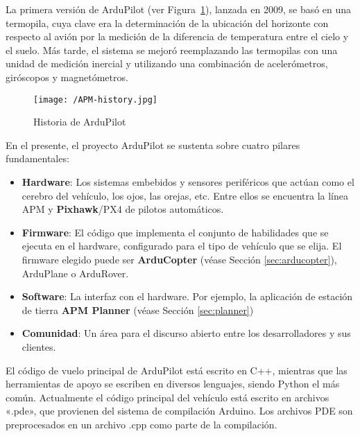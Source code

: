 La primera versión de ArduPilot (ver Figura~\ref{fig:APMHistory}), lanzada en 2009, se basó en una termopila, cuya clave era la determinación de la ubicación del horizonte con respecto al avión por la medición de la diferencia de temperatura entre el cielo y el suelo. Más tarde, el sistema se mejoró reemplazando las termopilas con una unidad de medición inercial y utilizando una combinación de acelerómetros, giróscopos y magnetómetros.

\begin{figure}[!h]
\begin{center}
\texttt{[image: /APM-history.jpg]}
\caption[Historia de ArduPilot]{Historia de ArduPilot \footnotemark}
\label{fig:APMHistory}
\end{center}
\end{figure}


En el presente, el proyecto ArduPilot se sustenta sobre cuatro pilares fundamentales:

\begin{itemize}
\item \textbf{Hardware}: Los sistemas embebidos y sensores periféricos que actúan como el cerebro del vehículo, los ojos, las orejas, etc. Entre ellos se encuentra la línea APM y \textbf{Pixhawk}/PX4 de pilotos automáticos.
\item \textbf{Firmware}: El código que implementa el conjunto de habilidades que se ejecuta en el hardware, configurado para el 
tipo de vehículo que se elija. El firmware elegido puede ser \textbf{ArduCopter} (véase Sección \ref{sec:arducopter}), ArduPlane o ArduRover.
\item \textbf{Software}: La interfaz con el hardware. Por ejemplo, la aplicación de estación de tierra \textbf{APM Planner} (véase Sección \ref{sec:planner})
\item \textbf{Comunidad}: Un área para el discurso abierto entre los desarrolladores y sus clientes.
\end{itemize}

El código de vuelo principal de ArduPilot está escrito en C++, mientras que las herramientas de apoyo se escriben en diversos lenguajes, siendo Python el más común. Actualmente el código principal del vehículo está escrito en archivos «.pde», que provienen del sistema de compilación Arduino. Los archivos PDE son preprocesados en un archivo .cpp como parte de la compilación.

